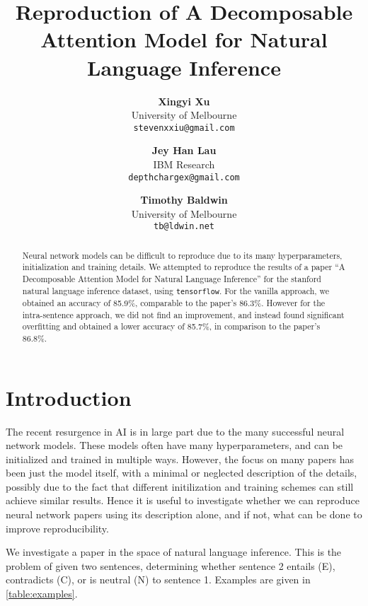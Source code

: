 \documentclass{article}
\begin{document}
\title{Reproduction of A Decomposable Attention Model for Natural Language Inference}

\author{
  \textbf{Xingyi Xu} \\ University of Melbourne \\ \texttt{stevenxxiu@gmail.com} \and
  \textbf{Jey Han Lau} \\ IBM Research \\ \texttt{depthchargex@gmail.com} \and
  \textbf{Timothy Baldwin} \\ University of Melbourne \\ \texttt{tb@ldwin.net}
}
\maketitle

\begin{abstract}
Neural network models can be difficult to reproduce due to its many hyperparameters, initialization and training details. We attempted to reproduce the results of a paper ``A Decomposable Attention Model for Natural Language Inference'' for the stanford natural language inference dataset, using \texttt{tensorflow}. For the vanilla approach, we obtained an accuracy of 85.9\%, comparable to the paper's 86.3\%. However for the intra-sentence approach, we did not find an improvement, and instead found significant overfitting and obtained a lower accuracy of 85.7\%, in comparison to the paper's 86.8\%.
\end{abstract}

\section{Introduction}
The recent resurgence in AI is in large part due to the many successful neural network models. These models often have many hyperparameters, and can be initialized and trained in multiple ways. However, the focus on many papers has been just the model itself, with a minimal or neglected description of the details, possibly due to the fact that different initilization and training schemes can still achieve similar results. Hence it is useful to investigate whether we can reproduce neural network papers using its description alone, and if not, what can be done to improve reproducibility.

We investigate a paper in the space of natural language inference. This is the problem of given two sentences, determining whether sentence 2 entails (E), contradicts (C), or is neutral (N) to sentence 1. Examples are given in \autoref{table:examples}.
\end{document}
